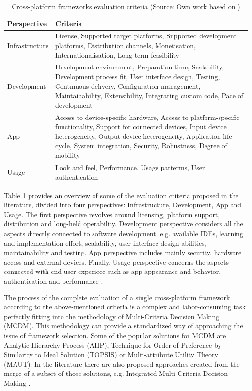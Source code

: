 \begin{table}[h]
	\centering
    \caption{Cross-platform frameworks evaluation criteria (Source: Own work based on \cite{rieger_eval_cp})}
    \label{tab:eval_criteria}
	\begin{tabular}{ |l|p{}| }
		\hline
        \textbf{Perspective}&\textbf{Criteria}\\
		\hline
		Infrastructure&License, Supported target platforms, Supported development platforms, Distribution channels, Monetisation, Internationalisation, Long-term feasibility\\
		\hline
		Development&Development environment, Preparation time, Scalability, Development process fit, User interface design, Testing, Continuous delivery, Configuration management, Maintainability, Extensibility, Integrating custom code, Pace of development\\
		\hline
		App&Access to device-specific hardware, Access to platform-specific functionality, Support for connected devices, Input device heterogeneity, Output device heterogeneity, Application life cycle, System integration, Security, Robustness, Degree of mobility\\
		\hline
		Usage&Look and feel, Performance, Usage patterms, User authentication\\
		\hline
	\end{tabular}
\end{table}

Table \ref{tab:eval_criteria} provides an overview of some of the evaluation criteria proposed in the literature, divided into four perspectives: Infrastructure, Development, App and Usage. The first perspective revolves around licensing, platform support, distribution and long-held operability. Development perspective considers all the aspects directly connected to software development, e.g. available IDEs, learning and implementation effort, scalability, user interface design abilities, maintainability and testing. App perspective includes mainly security, hardware access and external devices. Finally, Usage perspective concerns the aspects connected with end-user experiece such as app appearance and behavior, authentication and performance \cite{eval_rn_flutter,rieger_eval_cp}.

The process of the complete evaluation of a single cross-platform framework according to the above-mentioned criteria is a complex and labor-consuming task perfectly fitting into the methodology of Multi-Criteria Decision Making (MCDM). This methodology can provide a standardized way of approaching the issue of framework selection. Some of the popular solutions for MCDM are Analytic Hierarchy Process (AHP), Technique for Order of Preference by Similarity to Ideal Solution (TOPSIS) or Multi-attribute Utility Theory (MAUT). In the literature there are also proposed approaches created from the merge of a subset of those solutions, e.g. Integrated Multi-Criteria Decision Making \cite{lachgar_mcdm_cp}.
